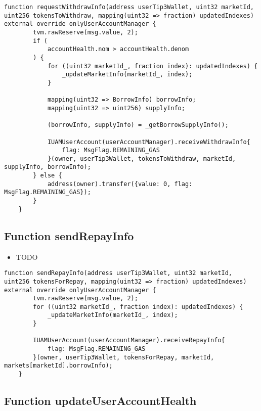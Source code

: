 \begin{lstlisting}[firstnumber=138]
    function requestWithdrawInfo(address userTip3Wallet, uint32 marketId, uint256 tokensToWithdraw, mapping(uint32 => fraction) updatedIndexes) external override onlyUserAccountManager {
        tvm.rawReserve(msg.value, 2);
        if (
            accountHealth.nom > accountHealth.denom
        ) {
            for ((uint32 marketId_, fraction index): updatedIndexes) {
                _updateMarketInfo(marketId_, index);
            }

            mapping(uint32 => BorrowInfo) borrowInfo;
            mapping(uint32 => uint256) supplyInfo;

            (borrowInfo, supplyInfo) = _getBorrowSupplyInfo();

            IUAMUserAccount(userAccountManager).receiveWithdrawInfo{
                flag: MsgFlag.REMAINING_GAS
            }(owner, userTip3Wallet, tokensToWithdraw, marketId, supplyInfo, borrowInfo);
        } else {
            address(owner).transfer({value: 0, flag: MsgFlag.REMAINING_GAS});
        }
    }
\end{lstlisting}

\subsection{Function sendRepayInfo}

\noindent\begin{itemize}
\item TODO
\end{itemize}

\begin{lstlisting}[firstnumber=223]
    function sendRepayInfo(address userTip3Wallet, uint32 marketId, uint256 tokensForRepay, mapping(uint32 => fraction) updatedIndexes) external override onlyUserAccountManager {
        tvm.rawReserve(msg.value, 2);
        for ((uint32 marketId_, fraction index): updatedIndexes) {
            _updateMarketInfo(marketId_, index);
        }

        IUAMUserAccount(userAccountManager).receiveRepayInfo{
            flag: MsgFlag.REMAINING_GAS
        }(owner, userTip3Wallet, tokensForRepay, marketId, markets[marketId].borrowInfo);
    }
\end{lstlisting}

\subsection{Function updateUserAccountHealth}

